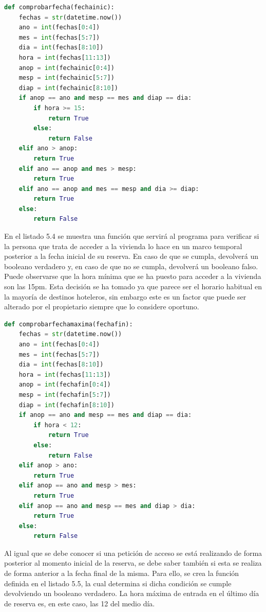 \begin{lstlisting}[language=Python,
    caption={Función que verifica si una petición es posterior a la fecha inicial de la reserva},
    label=src:comprueba-fecha-inicial
]
def comprobarfecha(fechainic):
    fechas = str(datetime.now())
    ano = int(fechas[0:4])
    mes = int(fechas[5:7])
    dia = int(fechas[8:10])
    hora = int(fechas[11:13])
    anop = int(fechainic[0:4])
    mesp = int(fechainic[5:7])
    diap = int(fechainic[8:10])
    if anop == ano and mesp == mes and diap == dia:
        if hora >= 15:
            return True
        else:
            return False   
    elif ano > anop:
        return True
    elif ano == anop and mes > mesp:
        return True
    elif ano == anop and mes == mesp and dia >= diap:
        return True
    else:
        return False
\end{lstlisting}
En el listado 5.4 se muestra una función que servirá al programa para verificar si la persona que trata de acceder a la vivienda lo hace en un marco temporal posterior a la fecha inicial de su reserva. En caso de que se cumpla, devolverá un booleano verdadero y, en caso de que no se cumpla, devolverá un booleano falso. Puede observarse que la hora mínima que se ha puesto para acceder a la vivienda son las 15pm. Esta decisión se ha tomado ya que parece ser el horario habitual en la mayoría de destinos hoteleros, sin embargo este es un factor que puede ser alterado por el propietario siempre que lo considere oportuno.
\begin{lstlisting}[language=Python,
    caption={Función que verifica si una petición es anterior a la fecha final de reserva},
    label=src:comprueba-fecha-final
]
def comprobarfechamaxima(fechafin):
    fechas = str(datetime.now())
    ano = int(fechas[0:4])
    mes = int(fechas[5:7])
    dia = int(fechas[8:10])
    hora = int(fechas[11:13])
    anop = int(fechafin[0:4])
    mesp = int(fechafin[5:7])
    diap = int(fechafin[8:10])
    if anop == ano and mesp == mes and diap == dia:
        if hora < 12:
            return True
        else:
            return False
    elif anop > ano:
        return True
    elif anop == ano and mesp > mes:
        return True
    elif anop == ano and mesp == mes and diap > dia:
        return True
    else:
        return False
\end{lstlisting}
Al igual que se debe conocer si una petición de acceso se está realizando de forma posterior al momento inicial de la reserva, se debe saber también si esta se realiza de forma anterior a la fecha final de la misma. Para ello, se crea la función definida en el listado 5.5, la cual determina si dicha condición se cumple devolviendo un booleano verdadero. La hora máxima de entrada en el último día de reserva es, en este caso, las 12 del medio día.
